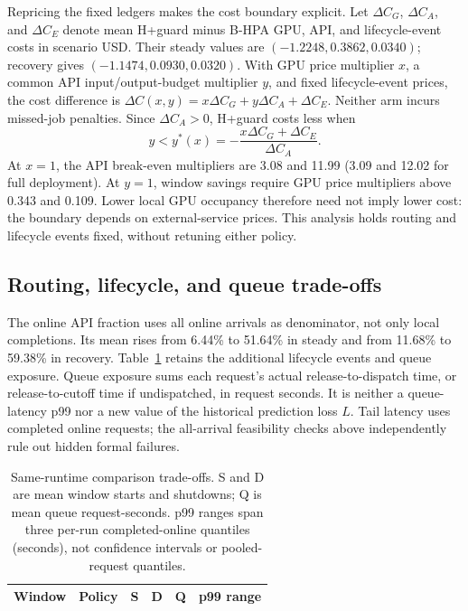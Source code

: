 Repricing the fixed ledgers makes the cost boundary explicit. Let
$\Delta C_G$, $\Delta C_A$, and $\Delta C_E$ denote mean H+guard minus
B-HPA GPU, API, and lifecycle-event costs in scenario USD.
Their steady values are $(-1.2248,0.3862,0.0340)$;
recovery gives $(-1.1474,0.0930,0.0320)$.
With GPU price multiplier $x$, a common API input/output-budget multiplier
$y$, and fixed lifecycle-event prices, the cost difference is
$\Delta C(x,y)=x\Delta C_G+y\Delta C_A+\Delta C_E$.
Neither arm incurs missed-job penalties. Since $\Delta C_A>0$, H+guard
costs less when
\[
y<y^*(x)=-\frac{x\Delta C_G+\Delta C_E}{\Delta C_A}.
\]
At $x=1$, the API break-even multipliers are 3.08 and 11.99
(3.09 and 12.02 for full deployment).
At $y=1$, window savings require GPU price multipliers above 0.343 and
0.109. Lower local GPU occupancy therefore need not imply lower cost:
the boundary depends on external-service prices. This analysis holds
routing and lifecycle events fixed, without retuning either policy.

\subsection{Routing, lifecycle, and queue trade-offs}
The online API fraction uses all online arrivals as denominator, not only local
completions. Its mean rises from 6.44\% to 51.64\% in steady and from 11.68\% to
59.38\% in recovery. Table~\ref{tab:e1tradeoffs} retains the additional lifecycle
events and queue exposure. Queue exposure sums each request's actual
release-to-dispatch time, or release-to-cutoff time if undispatched, in request
seconds. It is neither a queue-latency p99 nor a new value of the historical
prediction loss $L$. Tail latency uses completed online requests; the all-arrival
feasibility checks above independently rule out hidden formal failures.

\begin{table}[t]
\centering
\small
\caption{Same-runtime comparison trade-offs. S and D are mean window starts and shutdowns; Q is
mean queue request-seconds. p99 ranges span three per-run completed-online
quantiles (seconds), not confidence intervals or pooled-request quantiles.}
\label{tab:e1tradeoffs}
\setlength{\tabcolsep}{2pt}
\par\vspace{4pt}
\begin{tabular*}{\linewidth}{@{\extracolsep{\fill}}llrrrr@{}}
\toprule
Window & Policy & S & D & Q & p99 range\\
\midrule

\end{tabular*}
\end{table}


